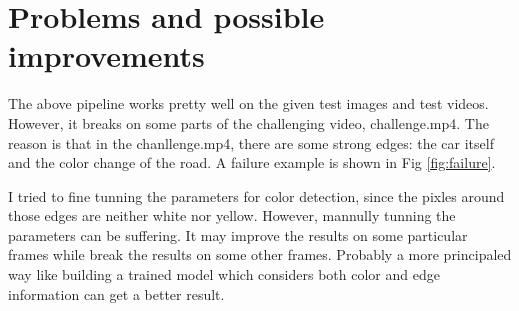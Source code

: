 \documentclass[12pt]{article}
\begin{document}
\section{Problems and possible improvements}
The above pipeline works pretty well on the given test images and test videos. However, it breaks on some parts of the challenging video, challenge.mp4. The reason is that in the chanllenge.mp4, there are some strong edges: the car itself and the color change of the road. A failure example is shown in Fig \ref{fig:failure}. 

I tried to fine tunning the parameters for color detection, since the pixles around those edges are neither white nor yellow. However, mannully tunning the parameters can be suffering. It may improve the results on some particular frames while break the results on some other frames. Probably a more principaled way like building a trained model which considers both color and edge information can get a better result.
\end{document}
